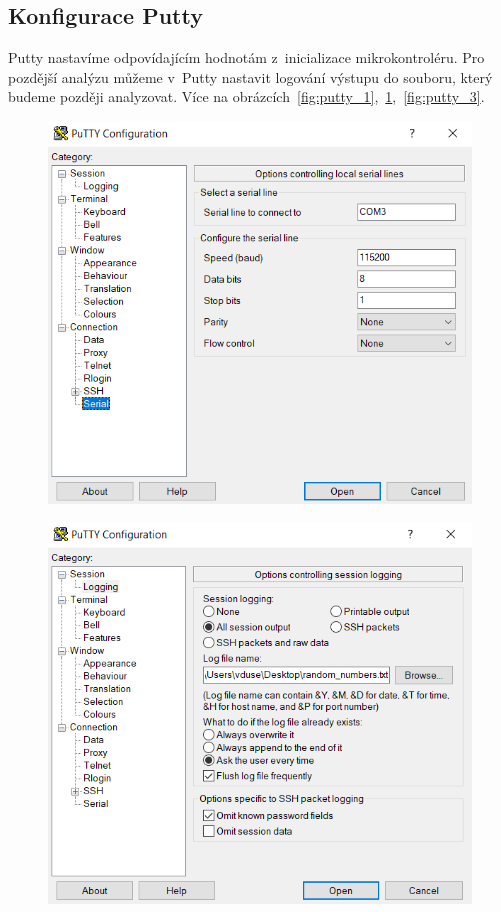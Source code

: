 \documentclass[11pt, a4paper, titlepage]{article}
\begin{document}
\subsection{Konfigurace Putty}

Putty nastavíme odpovídajícím hodnotám z~inicializace mikrokontroléru. Pro pozdější analýzu můžeme v~Putty nastavit logování výstupu do souboru, který budeme později analyzovat. Více na obrázcích~\ref{fig:putty_1},~\ref{fig:putty_2},~\ref{fig:putty_3}.

\begin{figure}[H]
    \centering
    \begin{minipage}{.5\textwidth}
    \centering
    \includegraphics[width=.97\textwidth]{images/putty_1.png}
    \label{fig:putty_1}
    \end{minipage}%
    \begin{minipage}{.5\textwidth}
    \centering
    \includegraphics[width=.97\textwidth]{images/putty_2.png}
    \label{fig:putty_2}
    \end{minipage}
\end{figure}
\end{document}
